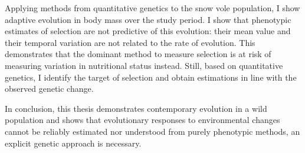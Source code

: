 \begin{summary}
Applying methods from quantitative genetics to the snow vole population, I show adaptive evolution in body mass over the study period. I show that phenotypic estimates of selection are not predictive of this evolution: their mean value and their temporal variation are not related to the rate of evolution. This demonstrates that the dominant method to measure selection is at risk of measuring variation in nutritional status instead. Still, based on quantitative genetics, I identify the target of selection and obtain estimations in line with the observed genetic change. 

In conclusion, this thesis demonstrates contemporary evolution in a wild population and shows that evolutionary responses to environmental changes cannot be reliably estimated nor understood from purely phenotypic methods, an explicit genetic approach is necessary. 

\end{summary}
